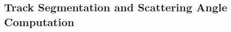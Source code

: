 \documentclass[a4paper,11pt]{article}
\begin{document}













\subsection{Track Segmentation and Scattering Angle Computation}\label{track_segmentation_and_scattering_angle_computation_section}
\end{document}
